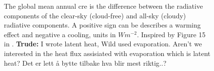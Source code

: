 \begin{figure}[ht]
    \caption{The global mean annual \acrfull{cre} is the difference between the radiative components of the clear-sky (cloud-free) and all-sky (cloudy) radiative components. A positive sign can be describes a warming effect and negative a cooling, units in $W m^{-2}$. Inspired by Figure 15 in \cite{Wild2019TheModels}. \textbf{Trude:} I wrote latent heat, Wild used evaporation. Aren't we interested in the heat flux assisiated with evaporation which is latent heat? Det er lett å bytte tilbake hva blir mest riktig..?}
    \label{fig:cre}
\end{figure}